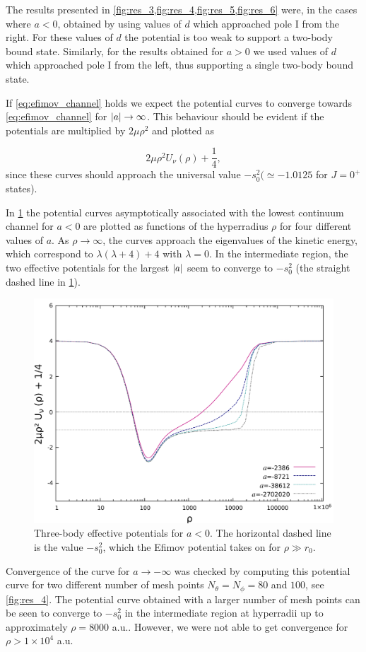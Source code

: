 The results presented in \cref{fig:res_3,fig:res_4,fig:res_5,fig:res_6} were, in the cases where $a<0$, obtained by using values of $d$ which approached pole $\mathrm{I}$ from the right. For these values of $d$ the potential is too weak to support a two-body bound state. Similarly, for the results obtained for $a>0$ we used values of $d$ which approached pole $\mathrm{I}$ from the left, thus supporting a single two-body bound state. 

If \eqref{eq:efimov_channel} holds we expect the potential curves to converge towards \eqref{eq:efimov_channel} for $\lvert a\rvert \rightarrow \infty$. This behaviour should be evident if the potentials are multiplied by $2 \mu \rho^2$ and plotted as 

\begin{equation}\label{eq:lambda}
2 \mu \rho^2 U_{\nu}(\rho) + \frac{1}{4},
\end{equation}
since these curves should approach the universal value $-s_0^2 (\simeq -1.0125$ for $J=0^+$ states).

In \cref{fig:res_3} the potential curves asymptotically associated with the lowest continuum channel for $a<0$ are plotted as functions of the hyperradius $\rho$ for four different values of $a$. As $\rho \rightarrow \infty$, the curves approach the eigenvalues of the kinetic energy, which correspond to $\lambda(\lambda + 4) + 4$ with $\lambda = 0$. In the intermediate region, the two effective potentials for the largest $\lvert a\rvert$ seem to converge to $-s_0^2$ (the straight dashed line in \cref{fig:res_3}). 

\begin{figure}
	\includegraphics[width=\linewidth]{plotneg_dashed.pdf}
	\caption{Three-body effective potentials for $a<0$. The horizontal dashed line is the value $-s_0^2$, which the Efimov potential takes on for $\rho\gg r_0$.}
	\label{fig:res_3}
\end{figure}
Convergence of the curve for $a \rightarrow -\infty$ was checked by computing this potential curve for two different number of mesh points $N_{\theta}=N_{\phi}=80$ and $100$, see \cref{fig:res_4}. The potential curve obtained with a larger number of mesh points can be seen to converge to $-s_0^2$ in the intermediate region at hyperradii up to approximately $\rho=8000$ a.u.. However, we were not able to get convergence for $\rho>1 \times 10^4$ a.u. 

